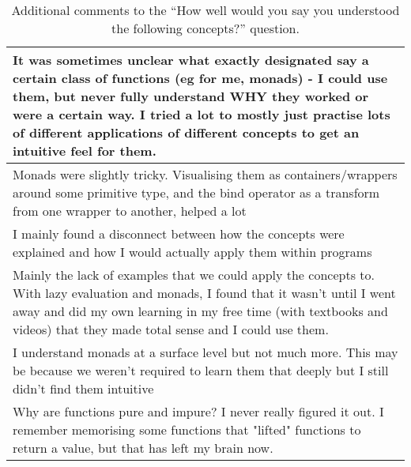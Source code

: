 \begin{table}[h]
    \centering
    \begin{tabular}{p{\linewidth}}\hline
    It was sometimes unclear what exactly designated say a certain class of functions (eg for me, monads) - I could use them, but never fully understand WHY they worked or were a certain way. I tried a lot to mostly just practise lots of different applications of different concepts to get an intuitive feel for them.\\\hline
    Monads were slightly tricky. Visualising them as containers/wrappers around some primitive type, and the bind operator as a transform from one wrapper to another, helped a lot\\\hline
    I mainly found a disconnect between how the concepts were explained and how I would actually apply them within programs\\\hline
    Mainly the lack of examples that we could apply the concepts to. With lazy evaluation and monads, I found that it wasn't until I went away and did my own learning in my free time (with textbooks and videos) that they made total sense and I could use them.\\\hline
    I understand monads at a surface level but not much more. This may be because we weren’t required to learn them that deeply but I still didn’t find them intuitive\\\hline
    Why are functions pure and impure? I never really figured it out. I remember memorising some functions that "lifted" functions to return a value, but that has left my brain now.\\\hline
    \end{tabular}
    \caption{Additional comments to the ``How well would you say you understood the following concepts?'' question.}
    \label{tab:comments}
\end{table}

